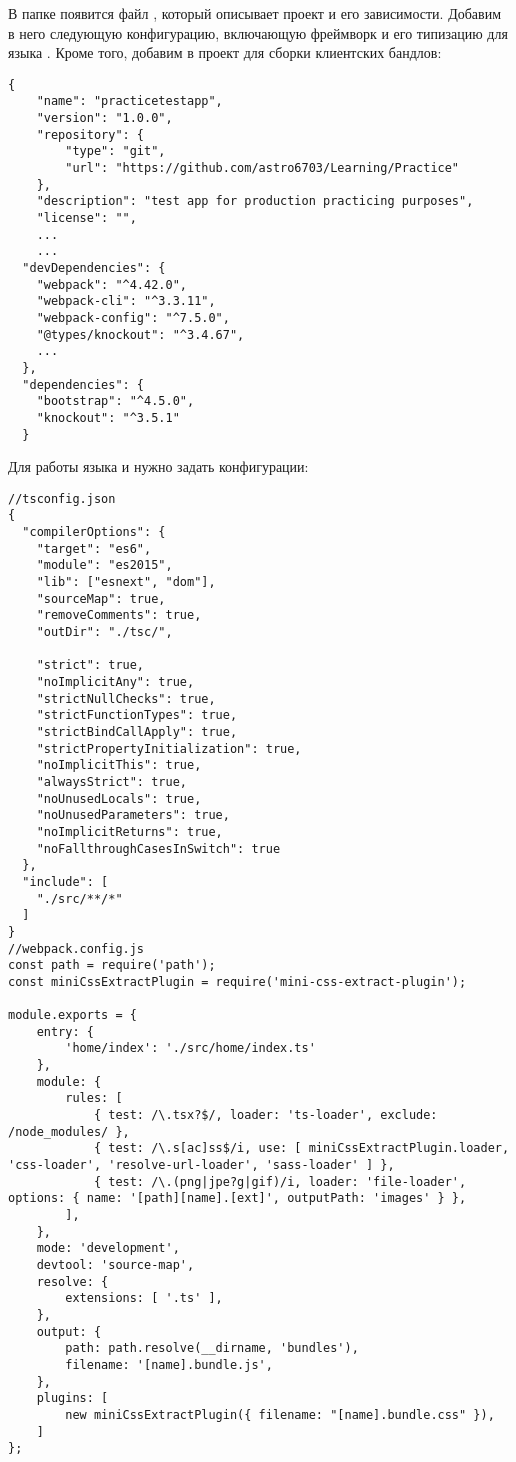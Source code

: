 \documentclass[a4paper,14pt]{extarticle}
\begin{document}
В папке появится файл , который описывает проект и его
зависимости. Добавим в него следующую конфигурацию, включающую фреймворк
 и его типизацию для языка . Кроме того,
добавим в проект  для сборки клиентских бандлов:

\begin{lstlisting}
{
    "name": "practicetestapp",
    "version": "1.0.0",
    "repository": {
        "type": "git",
        "url": "https://github.com/astro6703/Learning/Practice"
    },
    "description": "test app for production practicing purposes",
    "license": "",
    ...
    ...
  "devDependencies": {
    "webpack": "^4.42.0",
    "webpack-cli": "^3.3.11",
    "webpack-config": "^7.5.0",
    "@types/knockout": "^3.4.67",
    ...
  },
  "dependencies": {
    "bootstrap": "^4.5.0",
    "knockout": "^3.5.1"
  }
\end{lstlisting}

Для работы языка  и  нужно задать конфигурации:

\begin{lstlisting}
//tsconfig.json
{
  "compilerOptions": {
    "target": "es6",
    "module": "es2015",
    "lib": ["esnext", "dom"],
    "sourceMap": true,
    "removeComments": true,
    "outDir": "./tsc/",

    "strict": true,
    "noImplicitAny": true,
    "strictNullChecks": true,
    "strictFunctionTypes": true,
    "strictBindCallApply": true,
    "strictPropertyInitialization": true,
    "noImplicitThis": true,
    "alwaysStrict": true,
    "noUnusedLocals": true,
    "noUnusedParameters": true,
    "noImplicitReturns": true,
    "noFallthroughCasesInSwitch": true
  },
  "include": [
    "./src/**/*"
  ]
}
//webpack.config.js
const path = require('path');
const miniCssExtractPlugin = require('mini-css-extract-plugin');

module.exports = {
    entry: {
        'home/index': './src/home/index.ts'
    },
    module: {
        rules: [
            { test: /\.tsx?$/, loader: 'ts-loader', exclude: /node_modules/ },
            { test: /\.s[ac]ss$/i, use: [ miniCssExtractPlugin.loader, 'css-loader', 'resolve-url-loader', 'sass-loader' ] },
            { test: /\.(png|jpe?g|gif)/i, loader: 'file-loader', options: { name: '[path][name].[ext]', outputPath: 'images' } },
        ],
    },
    mode: 'development',
    devtool: 'source-map',
    resolve: {
        extensions: [ '.ts' ],
    },
    output: {
        path: path.resolve(__dirname, 'bundles'),
        filename: '[name].bundle.js',
    },
    plugins: [
        new miniCssExtractPlugin({ filename: "[name].bundle.css" }),
    ]
};
\end{lstlisting}
\end{document}
